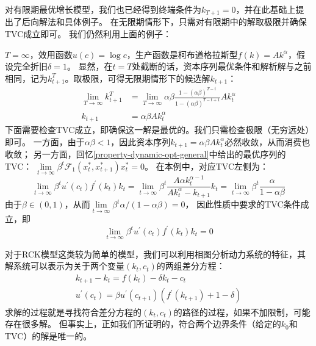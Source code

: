 对有限期最优增长模型，我们也已经得到终端条件为$k_{T+1}=0$，并在此基础上提出了后向解法和具体例子。
在无限期情形下，只需对有限期中的解取极限并确保TVC成立即可。
我们仍然利用上面的例子：
\begin{example}
    $T=\infty$，效用函数$u(c) = \log c$，生产函数是柯布道格拉斯型$f(k) = Ak^{\alpha}$，假设完全折旧$\delta = 1$。
    显然，在$t=T$处截断的话，资本序列最优条件和解析解与之前相同，记为$k_{t+1}^T$。取极限，可得无限期情形下的候选解$k_{t+1}$：
    \begin{equation*}
        \begin{aligned}
            \lim _{T \rightarrow \infty} k_{t+1}^T & =\lim _{T \rightarrow \infty} \alpha \beta 
                \frac{1-(\alpha \beta)^{T-t}}{1-(\alpha \beta)^{T-t+1}} A k_t^\alpha \\
            k_{t+1} & =\alpha \beta A k_t^\alpha
        \end{aligned}
    \end{equation*}
    下面需要检查TVC成立，即确保这一解是最优的。我们只需检查极限（无穷远处）即可。
    一方面，由于$\alpha\beta<1$，因此资本序列$k_{t+1}  =\alpha \beta A k_t^\alpha$必然收敛，从而消费也收敛；
    另一方面，回忆\cref{property-dynamic-opt-general}中给出的最优序列的TVC：
    $\lim\limits_{t\rightarrow\infty}\beta^t \mathcal{F}_1\left(x_t^*,x_{t+1}^*\right) x_t^*=0$。
    在本例中，对应TVC左侧为：
    \begin{equation*}
        \lim _{t \rightarrow \infty} \beta^t u^{\prime}\left(c_t\right) f^{\prime}\left(k_t\right) k_t
            =\lim _{t \rightarrow \infty} \beta^t \frac{A \alpha k_t^{\alpha-1}}{A k_t^\alpha-k_{t+1}} k_t
            =\lim_{t \rightarrow \infty} \beta^t \frac{\alpha}{1-\alpha\beta}
    \end{equation*}
    由于$\beta\in (0,1)$，从而$\lim\limits_{t\rightarrow \infty}\beta^t \alpha / (1-\alpha\beta)=0$，
    因此性质中要求的TVC条件成立，即
    \begin{equation*}
        \lim _{t \rightarrow \infty} \beta^t u^{\prime}\left(c_t\right) f^{\prime}\left(k_t\right) k_t = 0
    \end{equation*}
\end{example}

对于RCK模型这类较为简单的模型，我们可以利用相图分析动力系统的特征，其解系统可以表示为关于两个变量$(k_t,c_t)$的两组差分方程：
\begin{equation*}
    \begin{aligned}
        k_{t+1} - k_t = f(k_t) - \delta k_t - c_t \\
        u^{\prime}(c_t) = \beta u^{\prime}(c_{t+1})\left(f^{\prime}\left(k_{t+1}\right)+1-\delta\right)
    \end{aligned}
\end{equation*}
求解的过程就是寻找符合差分方程的$(k_t,c_t)$的路径的过程，如果不加限制，可能存在很多解。
但事实上，正如我们所证明的，符合两个边界条件（给定的$k_0$和TVC）的解是唯一的。

